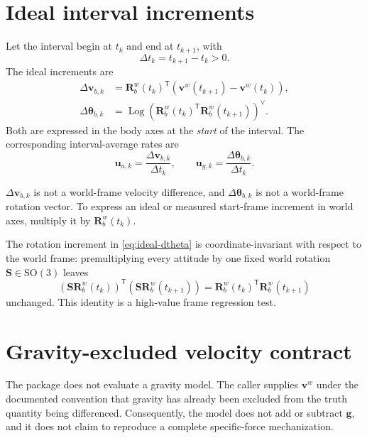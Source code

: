 \documentclass[11pt,oneside,headings=big]{scrreprt}
\newcommand{\Rwb}[1][]{\mathbf{R}^{w}_{b#1}}
\newcommand{\Log}{\operatorname{Log}}
\newcommand{\transpose}{\mathsf{T}}
\newcommand{\vect}[1]{\bm{#1}}
\newcommand{\mat}[1]{\bm{#1}}
\begin{document}
    \section{Ideal interval increments}
    Let the interval begin at \(t_k\) and end at \(t_{k+1}\), with
    \begin{equation}
        \Delta t_k=t_{k+1}-t_k>0.
    \end{equation}
    The ideal increments are
    \begin{align}
        \Delta\vect v_{b,k}
        &=\Rwb(t_k)^\transpose
        \left(\vect v^w(t_{k+1})-\vect v^w(t_k)\right),
        \label{eq:ideal-dv}\\
        \Delta\vect\theta_{b,k}
        &=\Log\!\left(\Rwb(t_k)^\transpose\Rwb(t_{k+1})\right)^\vee.
        \label{eq:ideal-dtheta}
    \end{align}
    Both are expressed in the body axes at the \emph{start} of the interval. The
    corresponding interval-average rates are
    \begin{equation}
        \vect u_{a,k}=\frac{\Delta\vect v_{b,k}}{\Delta t_k},
        \qquad
        \vect u_{g,k}=\frac{\Delta\vect\theta_{b,k}}{\Delta t_k}.
        \label{eq:ideal-rates}
    \end{equation}

    \begin{warningbox}
        \(\Delta\vect v_{b,k}\) is not a world-frame velocity difference, and
        \(\Delta\vect\theta_{b,k}\) is not a world-frame rotation vector. To express
        an ideal or measured start-frame increment in world axes, multiply it by
        \(\Rwb(t_k)\).
    \end{warningbox}

    The rotation increment in \cref{eq:ideal-dtheta} is coordinate-invariant with
    respect to the world frame: premultiplying every attitude by one fixed world
    rotation \(\mat S\in\mathrm{SO}(3)\) leaves
    \begin{equation}
        (\mat S\Rwb(t_k))^\transpose(\mat S\Rwb(t_{k+1}))
        =\Rwb(t_k)^\transpose\Rwb(t_{k+1})
    \end{equation}
    unchanged. This identity is a high-value frame regression test.


    \section{Gravity-excluded velocity contract}
    The package does not evaluate a gravity model. The caller supplies
    \(\vect v^w\) under the documented convention that gravity has already been
    excluded from the truth quantity being differenced. Consequently, the model does
    not add or subtract \(\vect g\), and it does not claim to reproduce a complete
    specific-force mechanization.
\end{document}
